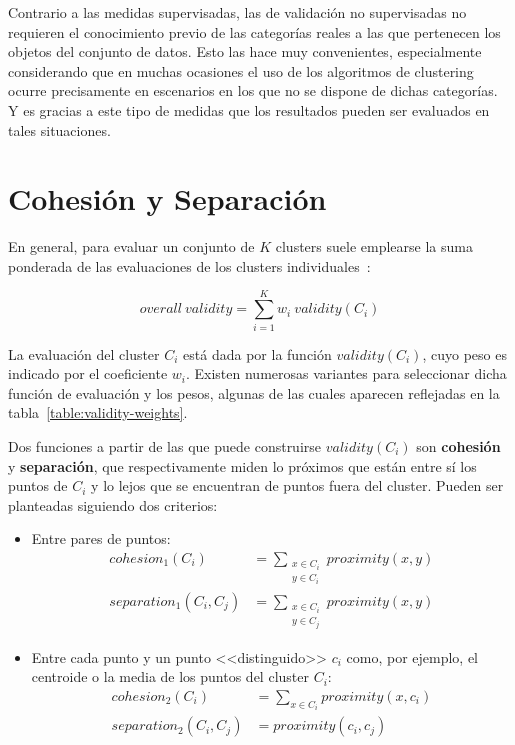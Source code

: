 Contrario a las medidas supervisadas, las de validación no supervisadas no requieren el conocimiento previo de las categorías reales a las que pertenecen los objetos del conjunto de datos.
Esto las hace muy convenientes, especialmente considerando que en muchas ocasiones el uso de los algoritmos de clustering ocurre precisamente en escenarios en los que no se dispone de dichas categorías.
Y es gracias a este tipo de medidas que los resultados pueden ser evaluados en tales situaciones.

\section{Cohesión y Separación}\label{sec:cohesiónYSeparación}

En general, para evaluar un conjunto de $K$ clusters suele emplearse la suma ponderada de las evaluaciones de los clusters individuales~\cite{Tan05}:

\begin{equation}
    \label{eq:overall-validity}
    overall\ validity = \sum_{i=1}^{K}{w_i\ validity(C_i)}
\end{equation}

La evaluación del cluster $C_i$ está dada por la función $validity(C_i)$, cuyo peso es indicado por el coeficiente $w_i$.
Existen numerosas variantes para seleccionar dicha función de evaluación y los pesos, algunas de las cuales aparecen reflejadas en la tabla~\ref{table:validity-weights}.

Dos funciones a partir de las que puede construirse $validity(C_i)$ son \textbf{cohesión} y \textbf{separación}, que respectivamente miden lo próximos que están entre sí los puntos de $C_i$ y lo lejos que se encuentran de puntos fuera del cluster.
Pueden ser planteadas siguiendo dos criterios:

\begin{itemize}
    \item Entre pares de puntos:
    \begin{align}
        cohesion_1(C_i) & = \sum_{\substack{x\in C_i \\ y\in C_i}}{proximity(x,y)} \\
        separation_1(C_i, C_j) & = \sum_{\substack{x\in C_i \\ y\in C_j}}{proximity(x,y)}
    \end{align}

    \item Entre cada punto y un punto <<distinguido>> $c_i$ como, por ejemplo, el centroide o la media de los puntos del cluster $C_i$:
    \begin{align}
        \label{eq:selected-point-cohesion}
        cohesion_2(C_i) & = \sum_{x\in C_i}{proximity(x,c_i)} \\
        \label{eq:selected-point-separation}
        separation_2(C_i, C_j) & = proximity(c_i,c_j)
    \end{align}
\end{itemize}

